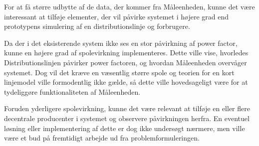 
For at få større udbytte af de data, der kommer fra Måleenheden, kunne det være interessant at tilføje elementer, der vil påvirke systemet i højere grad end prototypens simulering af en distributionslinje og forbrugere. 

Da der i det eksisterende system ikke ses en stor påvirkning af power factor, kunne en højere grad af spolevirkning implementeres. Dette ville vise, hvorledes Distributionslinjen påvirker power factoren, og hvordan Måleenheden overvåger systemet. Dog vil det kræve en væsentlig større spole og teorien for en kort linjemodel ville formodentlig ikke gælde, så dette ville hovedsageligt være for at tydeliggøre funktionaliteten af Måleenheden. 

Foruden yderligere spolevirkning, kunne det være relevant at tilføje en eller flere decentrale producenter i systemet og observere påvirkningen herfra. En eventuel løsning eller implementering af dette er dog ikke undersøgt nærmere, men ville være et bud på fremtidigt arbejde ud fra problemformuleringen. 